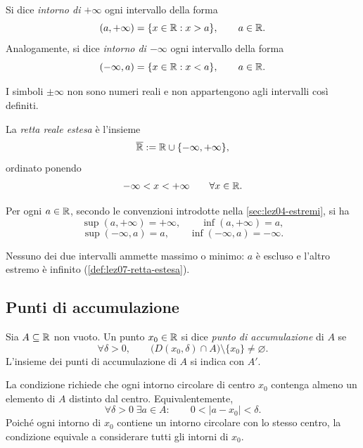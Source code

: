 \begin{definition}
\label{def:lez07-intorni-infinito}
Si dice \emph{intorno di \(+\infty\)}
ogni intervallo della forma
\[
  (a,+\infty)=\{x\in\mathbb{R}:x>a\},
  \qquad a\in\mathbb{R}.
\]
Analogamente, si dice \emph{intorno di \(-\infty\)}
ogni intervallo della forma
\[
  (-\infty,a)=\{x\in\mathbb{R}:x<a\},
  \qquad a\in\mathbb{R}.
\]
\end{definition}

I simboli \(\pm\infty\) non sono numeri reali e non
appartengono agli intervalli così definiti.

\begin{definition}
\label{def:lez07-retta-estesa}
La \emph{retta reale estesa} è l'insieme
\[
  \overline{\mathbb{R}}:=\mathbb{R}\cup\{-\infty,+\infty\},
\]
ordinato ponendo
\[
  -\infty<x<+\infty
  \qquad\forall x\in\mathbb{R}.
\]
\end{definition}

\begin{example}
\label{ex:lez07-estremi-infiniti}
Per ogni \(a\in\mathbb{R}\), secondo le convenzioni
introdotte nella \cref{sec:lez04-estremi}, si ha
\[
  \sup(a,+\infty)=+\infty,
  \qquad
  \inf(a,+\infty)=a,
\]
\[
  \sup(-\infty,a)=a,
  \qquad
  \inf(-\infty,a)=-\infty.
\]

Nessuno dei due intervalli ammette massimo o minimo:
\(a\) è escluso e l'altro estremo è infinito
(\cref{def:lez07-retta-estesa}).
\end{example}

\subsection{Punti di accumulazione}
\label{sec:lez07-punti-accumulazione}

\begin{definition}
\label{def:lez07-accumulazione}
Sia \(A\subseteq\mathbb{R}\) non vuoto. Un punto
\(x_0\in\mathbb{R}\) si dice \emph{punto di accumulazione}
di \(A\) se
\[
  \forall\delta>0,\qquad
  \bigl(D(x_0,\delta)\cap A\bigr)\setminus\{x_0\}
  \ne\varnothing.
\]
L'insieme dei punti di accumulazione di \(A\)
si indica con \(A'\).
\end{definition}

La condizione richiede che ogni intorno circolare
di centro \(x_0\) contenga almeno un elemento
di \(A\) distinto dal centro. Equivalentemente,
\[
  \forall\delta>0\;\exists a\in A:
  \qquad 0<|a-x_0|<\delta.
\]
Poiché ogni intorno di \(x_0\) contiene un intorno
circolare con lo stesso centro, la condizione
equivale a considerare tutti gli intorni di \(x_0\).

